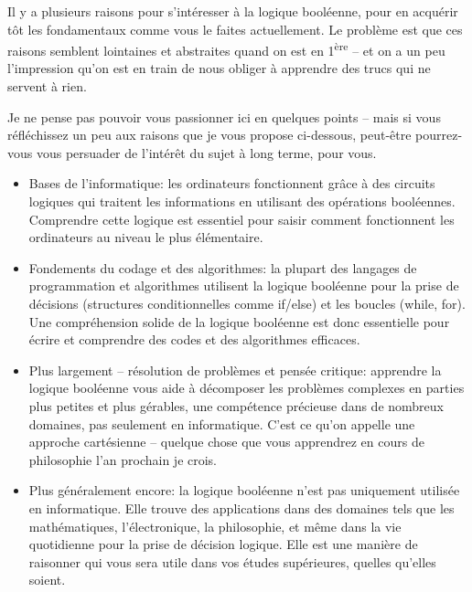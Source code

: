 \documentclass[12pt]{article}
\begin{document}
	Il y a plusieurs raisons pour s'intéresser à la logique booléenne, pour en acquérir tôt les fondamentaux comme vous le faites actuellement. Le problème est que ces raisons semblent lointaines et abstraites quand on est en 1\textsuperscript{ère} -- et on a un peu l'impression qu'on est en train de nous obliger à apprendre des trucs qui ne servent à rien.
	
	Je ne pense pas pouvoir vous passionner ici en quelques points -- mais si vous réfléchissez un peu aux raisons que je vous propose ci-dessous, peut-être pourrez-vous vous persuader de l'intérêt du sujet à long terme, pour vous.
	\begin{itemize}
		\item Bases de l'informatique: les ordinateurs fonctionnent grâce à des circuits logiques qui traitent les informations en utilisant des opérations booléennes. Comprendre cette logique est essentiel pour saisir comment fonctionnent les ordinateurs au niveau le plus élémentaire.
		\item Fondements du codage et des algorithmes: la plupart des langages de programmation et algorithmes utilisent la logique booléenne pour la prise de décisions (structures conditionnelles comme if/else) et les boucles (while, for). Une compréhension solide de la logique booléenne est donc essentielle pour écrire et comprendre des codes et des algorithmes efficaces.
		\item Plus largement -- résolution de problèmes et pensée critique: apprendre la logique booléenne vous aide à décomposer les problèmes complexes en parties plus petites et plus gérables, une compétence précieuse dans de nombreux domaines, pas seulement en informatique. C'est ce qu'on appelle une approche cartésienne -- quelque chose que vous apprendrez en cours de philosophie l'an prochain je crois.
		\item Plus généralement encore: la logique booléenne n'est pas uniquement utilisée en informatique. Elle trouve des applications dans des domaines tels que les mathématiques, l'électronique, la philosophie, et même dans la vie quotidienne pour la prise de décision logique. Elle est une manière de raisonner qui vous sera utile dans vos études supérieures, quelles qu'elles soient.
	\end{itemize}
	
\end{document}
